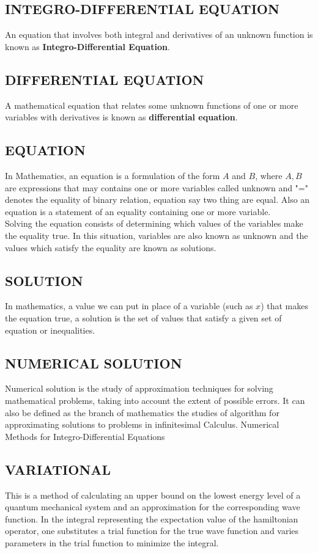 \documentclass[12pt]{report}
\newcommand{\bt}[1]{\textbf{#1}}
\newcommand{\NI}{\noindent}
\newcommand{\IDE}{Integro-Differential Equation}
\newcommand{\IDEs}{Integro-Differential Equations}
\begin{document}
	\subsection{INTEGRO-DIFFERENTIAL EQUATION}
	An equation that involves both integral and derivatives of an unknown function is known as \bt{\IDE}.
	
	\subsection{DIFFERENTIAL EQUATION}
	A mathematical equation that relates some unknown functions of one or more variables with derivatives is known as \bt{differential equation}.
	
	\subsection{EQUATION}
	In Mathematics, an equation is a formulation of the form $A$ and $B$,  where $A,B$ are expressions that may contains one or more variables called unknown and "=" denotes the equality of binary relation, equation say two thing are equal. Also an equation is a statement of an equality containing one or more variable.\\
	
	\NI Solving the equation consists of determining which values of the variables make the equality true. In this situation, variables are also known as unknown and the values which satisfy the equality are known as solutions.
	
	\subsection{SOLUTION}
	In mathematics, a value we can put in place of a variable (such as $x$) that makes the equation true, a solution is the set of values that satisfy a given set of equation or inequalities.
	
	\subsection{NUMERICAL SOLUTION}
	Numerical solution is the study of approximation techniques for solving mathematical problems, taking into account the extent of possible errors. It can also be defined as the branch of mathematics the studies of algorithm for approximating solutions to problems in infinitesimal Calculus. Numerical Methods for \IDEs 
	
	\subsection{VARIATIONAL} 
	This is a method of calculating an upper bound on the lowest energy level of a quantum mechanical system and an approximation for the corresponding wave function. In the integral representing the expectation value of the hamiltonian operator, one substitutes a trial function for the true wave function and varies parameters in the trial function to minimize the integral.
	
\end{document}

